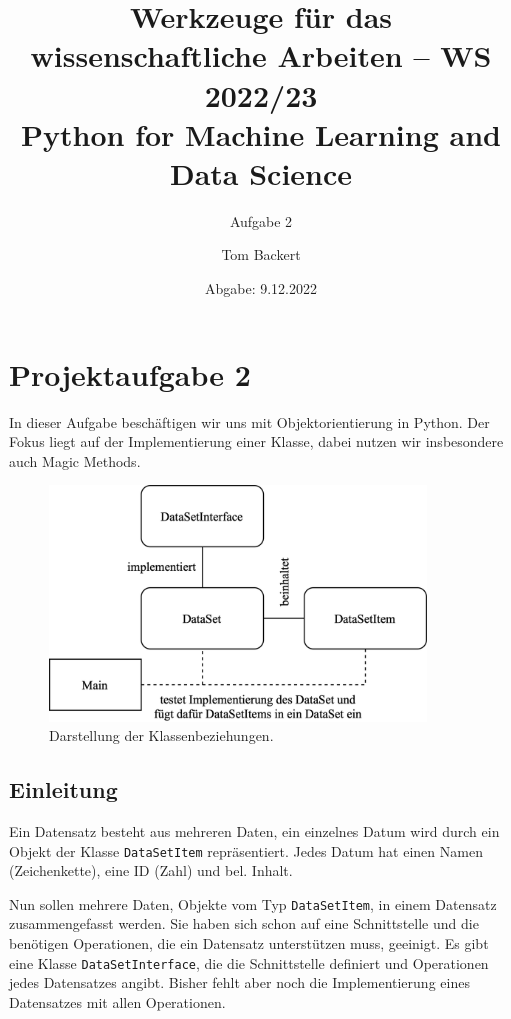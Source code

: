 \documentclass[
12pt,     %
a4paper,     %
parskip=full   %
]{scrartcl}
\author{Tom Backert}
\title{\large Werkzeuge für das wissenschaftliche Arbeiten -- WS 2022/23\\ \small
Python for Machine Learning and Data Science}
\subtitle{\huge Aufgabe 2}
\date{Abgabe: 9.12.2022}
\begin{document}
    \maketitle
    \tableofcontents


    \section{Projektaufgabe 2}
    In dieser Aufgabe beschäftigen wir uns mit Objektorientierung in Python.
    Der Fokus liegt auf der Implementierung einer Klasse, dabei nutzen wir insbesondere auch Magic Methods.

    \begin{figure}
        \centering
        \includegraphics[width=10cm]{./../diagram/classes_files.png}
        \caption{ Darstellung der Klassenbeziehungen.}
        \label{fig:my_label}
    \end{figure}





    \subsection{Einleitung}
        Ein Datensatz besteht aus mehreren Daten, ein einzelnes Datum wird durch ein Objekt der Klasse \verb|DataSetItem| repräsentiert.
        Jedes Datum hat einen Namen (Zeichenkette), eine ID (Zahl) und bel. Inhalt.

        Nun sollen mehrere Daten, Objekte vom Typ \verb|DataSetItem|, in einem Datensatz zusammengefasst werden.
        Sie haben sich schon auf eine Schnittstelle und die benötigen Operationen, die ein Datensatz unterstützen muss, geeinigt.
        Es gibt eine Klasse \verb|DataSetInterface|, die die Schnittstelle definiert und Operationen jedes Datensatzes angibt.
        Bisher fehlt aber noch die Implementierung eines Datensatzes mit allen Operationen.
\end{document}
